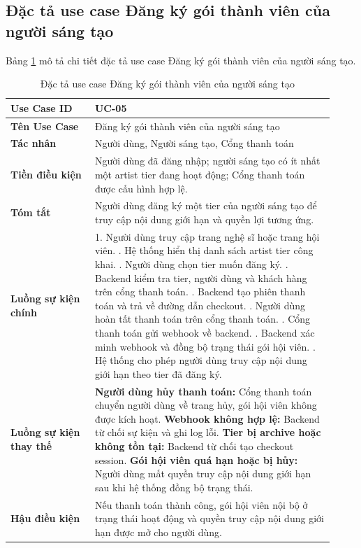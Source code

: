 \subsection{Đặc tả use case Đăng ký gói thành viên của người sáng tạo}
\label{subsection:2.3.5}

Bảng \ref{table:2_6} mô tả chi tiết đặc tả use case Đăng ký gói thành viên của người sáng tạo.
\begin{table}[h!]
    \caption{Đặc tả use case Đăng ký gói thành viên của người sáng tạo}
    \label{table:2_6}
\centering
\small
\renewcommand{\arraystretch}{1.2}
\begin{tabular}{|p{0.24\linewidth}|p{0.68\linewidth}|}
\hline
\textbf{Use Case ID} & UC-05 \\
\hline
\textbf{Tên Use Case} & Đăng ký gói thành viên của người sáng tạo \\
\hline
\textbf{Tác nhân} & Người dùng, Người sáng tạo, Cổng thanh toán \\
\hline
\textbf{Tiền điều kiện} & Người dùng đã đăng nhập; người sáng tạo có ít nhất một artist tier đang hoạt động; Cổng thanh toán được cấu hình hợp lệ. \\
\hline
\textbf{Tóm tắt} & Người dùng đăng ký một tier của người sáng tạo để truy cập nội dung giới hạn và quyền lợi tương ứng. \\
\hline
\textbf{Luồng sự kiện chính} &
1. Người dùng truy cập trang nghệ sĩ hoặc trang hội viên. \newline
2. Hệ thống hiển thị danh sách artist tier công khai. \newline
3. Người dùng chọn tier muốn đăng ký. \newline
4. Backend kiểm tra tier, người dùng và khách hàng trên cổng thanh toán. \newline
5. Backend tạo phiên thanh toán và trả về đường dẫn checkout. \newline
6. Người dùng hoàn tất thanh toán trên cổng thanh toán. \newline
7. Cổng thanh toán gửi webhook về backend. \newline
8. Backend xác minh webhook và đồng bộ trạng thái gói hội viên. \newline
9. Hệ thống cho phép người dùng truy cập nội dung giới hạn theo tier đã đăng ký. \\
\hline
\textbf{Luồng sự kiện thay thế} &
\textbf{Người dùng hủy thanh toán:} Cổng thanh toán chuyển người dùng về trang hủy, gói hội viên không được kích hoạt. \newline
\textbf{Webhook không hợp lệ:} Backend từ chối sự kiện và ghi log lỗi. \newline
\textbf{Tier bị archive hoặc không tồn tại:} Backend từ chối tạo checkout session. \newline
\textbf{Gói hội viên quá hạn hoặc bị hủy:} Người dùng mất quyền truy cập nội dung giới hạn sau khi hệ thống đồng bộ trạng thái. \\
\hline
\textbf{Hậu điều kiện} & Nếu thanh toán thành công, gói hội viên nội bộ ở trạng thái hoạt động và quyền truy cập nội dung giới hạn được mở cho người dùng. \\
\hline
\end{tabular}
\end{table}
\FloatBarrier


